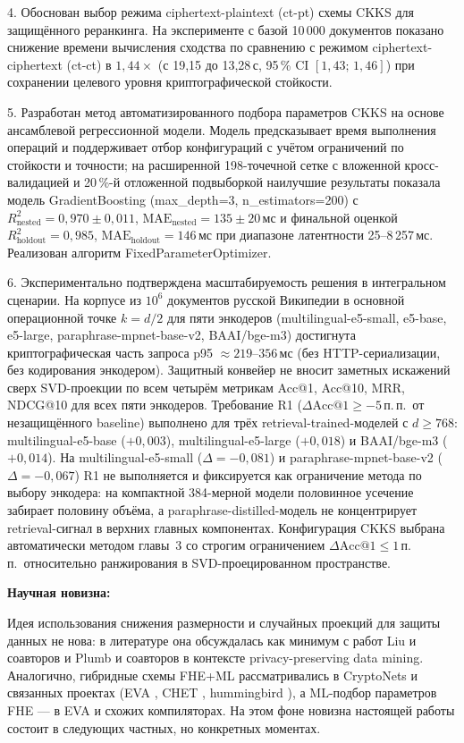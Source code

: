 \documentclass[a4paper, 12pt, oneside, openany]{article}
\begin{document}
4. Обоснован выбор режима ciphertext-plaintext (ct-pt) схемы CKKS для защищённого реранкинга. На эксперименте с базой 10\,000 документов показано снижение времени вычисления сходства по сравнению с режимом ciphertext-ciphertext (ct-ct) в $1{,}44\times$ (с 19,15 до 13,28\,с, 95\,\% CI $[1{,}43;\, 1{,}46]$) при сохранении целевого уровня криптографической стойкости.

5. Разработан метод автоматизированного подбора параметров CKKS на основе ансамблевой регрессионной модели. Модель предсказывает время выполнения операций и поддерживает отбор конфигураций с учётом ограничений по стойкости и точности; на расширенной 198-точечной сетке с вложенной кросс-валидацией и 20\,\%-й отложенной подвыборкой наилучшие результаты показала модель GradientBoosting (max\_depth=3, n\_estimators=200) с $R^{2}_{\text{nested}} = 0{,}970 \pm 0{,}011$, $\mathrm{MAE}_{\text{nested}} = 135 \pm 20$\,мс и финальной оценкой $R^{2}_{\text{holdout}} = 0{,}985$, $\mathrm{MAE}_{\text{holdout}} = 146$\,мс при диапазоне латентности 25--8\,257\,мс. Реализован алгоритм FixedParameterOptimizer.

6. Экспериментально подтверждена масштабируемость решения в интегральном сценарии. На корпусе из $10^6$ документов русской Википедии в основной операционной точке $k = d/2$ для пяти энкодеров (multilingual-e5-small, e5-base, e5-large, paraphrase-mpnet-base-v2, BAAI/bge-m3) достигнута криптографическая часть запроса p95 $\approx 219$--$356$\,мс (без HTTP-сериализации, без кодирования энкодером). Защитный конвейер не вносит заметных искажений сверх SVD-проекции по всем четырём метрикам Acc@1, Acc@10, MRR, NDCG@10 для всех пяти энкодеров. Требование R1 ($\Delta\mathrm{Acc@1} \geq -5$\,п.\,п.\ от незащищённого baseline) выполнено для трёх retrieval-trained-моделей с $d \geq 768$: multilingual-e5-base ($+0{,}003$), multilingual-e5-large ($+0{,}018$) и BAAI/bge-m3 ($+0{,}014$). На multilingual-e5-small ($\Delta = -0{,}081$) и paraphrase-mpnet-base-v2 ($\Delta = -0{,}067$) R1 не выполняется и фиксируется как ограничение метода по выбору энкодера: на компактной 384-мерной модели половинное усечение забирает половину объёма, а paraphrase-distilled-модель не концентрирует retrieval-сигнал в верхних главных компонентах. Конфигурация CKKS выбрана автоматически методом главы~3 со строгим ограничением $\Delta\mathrm{Acc@1} \leq 1$\,п.\,п.\ относительно ранжирования в SVD-проецированном пространстве.


\textbf{Научная новизна:}

Идея использования снижения размерности и случайных проекций для защиты данных не нова: в литературе она обсуждалась как минимум с работ Liu и соавторов \cite{ref63} и Plumb и соавторов \cite{ref64} в контексте privacy-preserving data mining. Аналогично, гибридные схемы FHE+ML рассматривались в CryptoNets \cite{ref50} и связанных проектах (EVA \cite{ref66}, CHET \cite{ref67}, hummingbird \cite{ref68}), а ML-подбор параметров FHE --- в EVA и схожих компиляторах. На этом фоне новизна настоящей работы состоит в следующих частных, но конкретных моментах.
\end{document}
